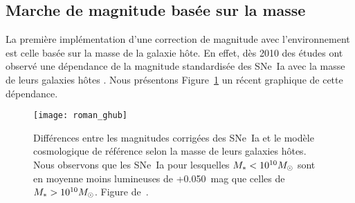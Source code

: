 \documentclass[../main/main.tex]{subfiles}
\begin{document}

% 
% 
% 



\subsection{Marche de magnitude basée sur la masse}\label{ssec:mstep}


La première implémentation d'une correction de magnitude avec l'environnement
est celle basée sur la masse de la galaxie hôte. En effet, dès 2010 des études
ont observé une dépendance de la magnitude standardisée des SNe~Ia avec la masse
de leurs galaxies hôtes \citep[voir par exemple][]{kelly2010, betoule2014}. Nous
présentons Figure~\ref{fig:mbmass} un récent graphique de cette dépendance.

\begin{figure}[htb]
    \centering
    \texttt{[image: roman\_ghub]}
    \caption[Marche de magnitude basée sur la masse]{Différences entre les
        magnitudes corrigées des SNe~Ia et le modèle cosmologique de référence
        selon la masse de leurs galaxies hôtes. Nous observons que les SNe~Ia
        pour lesquelles $M_* < 10^{10}M_{\odot}$ sont en moyenne moins lumineuses de
        +\SI{0.050}{mag} que celles de $M_* > 10^{10}M_{\odot}$. Figure
    de~\cite{roman2018}.}
    \label{fig:mbmass}
\end{figure}
\end{document}
